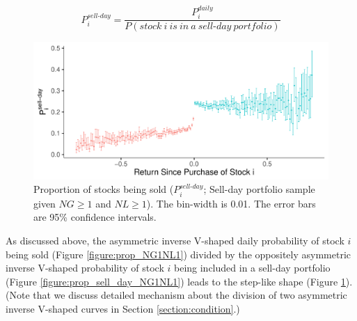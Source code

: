 \documentclass[11pt, a4paper]{article}
\begin{document}
\begin{equation}
	\label{eq:1}
P^{sell\mbox{-}day}_{i} = \frac{P^{daily}_{i}}{P(stock~i~is~in~a~sell\mbox{-}day~portfolio)}
\end{equation}
\small
\normalsize


\begin{figure}[H]
	\centering
	\includegraphics[width=0.8\columnwidth]{barc_schedule_sell_day_NG1_NL1_3.pdf}
	\caption{\small Proportion of stocks being sold ($P^{sell\mbox{-}day}_{i}$; Sell-day portfolio sample given $NG\geq1$ and $NL\geq1$). The bin-width is 0.01. The error bars are 95\% confidence intervals.}
	\label{figure:prop_sell_days_NG1NL1}
\end{figure}

As discussed above, the asymmetric inverse V-shaped daily probability of stock $i$ being sold (Figure \ref{figure:prop_NG1NL1}) divided by the oppositely asymmetric inverse V-shaped probability of stock $i$ being included in a sell-day portfolio (Figure \ref{figure:prop_sell_day_NG1NL1}) leads to the step-like shape (Figure \ref{figure:prop_sell_days_NG1NL1}). (Note that we discuss detailed mechanism about the division of two asymmetric inverse V-shaped curves in Section \ref{section:condition}.) \\

\end{document}
